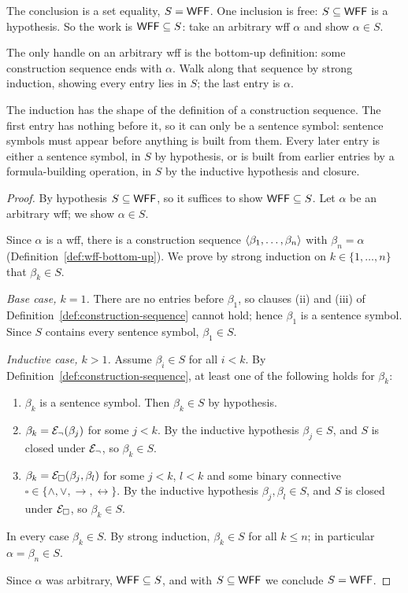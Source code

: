 \documentclass[11pt]{article}
\begin{document}
\begin{quantified}
\end{quantified}

\begin{remark}
The conclusion is a set equality, $S=\mathsf{WFF}$. One inclusion is free:
$S\subseteq\mathsf{WFF}$ is a hypothesis. So the work is $\mathsf{WFF}\subseteq S$: take an
arbitrary wff $\alpha$ and show $\alpha\in S$.

The only handle on an arbitrary wff is the bottom-up definition: some
construction sequence ends with $\alpha$. Walk along that sequence by strong
induction, showing every entry lies in $S$; the last entry is $\alpha$.

The induction has the shape of the definition of a construction sequence.
The first entry has nothing before it, so it can only be a sentence symbol:
sentence symbols must appear before anything is built from them. Every
later entry is either a sentence symbol, in $S$ by hypothesis, or is built
from earlier entries by a formula-building operation, in $S$ by the
inductive hypothesis and closure.
\end{remark}

\begin{proof}
By hypothesis $S\subseteq\mathsf{WFF}$, so it suffices to show $\mathsf{WFF}\subseteq S$.
Let $\alpha$ be an arbitrary wff; we show $\alpha\in S$.

Since $\alpha$ is a wff, there is a construction sequence
$\langle \beta_1,\dots,\beta_n\rangle$ with $\beta_n=\alpha$
(Definition~\ref{def:wff-bottom-up}). We prove by strong induction on
$k\in\{1,\dots,n\}$ that $\beta_k\in S$.

\emph{Base case, $k=1$.} There are no entries before $\beta_1$, so clauses
(ii) and (iii) of Definition~\ref{def:construction-sequence} cannot hold;
hence $\beta_1$ is a sentence symbol. Since $S$ contains every sentence
symbol, $\beta_1\in S$.

\emph{Inductive case, $k>1$.} Assume $\beta_i\in S$ for all $i<k$. By
Definition~\ref{def:construction-sequence}, at least one of the following
holds for $\beta_k$:
\begin{enumerate}[label=(\roman*)]
\item $\beta_k$ is a sentence symbol. Then $\beta_k\in S$ by hypothesis.
\item $\beta_k=\mathcal{E}_{\neg}(\beta_j)$ for some $j<k$. By the inductive
  hypothesis $\beta_j\in S$, and $S$ is closed under $\mathcal{E}_{\neg}$, so
  $\beta_k\in S$.
\item $\beta_k=\mathcal{E}_{\square}(\beta_j,\beta_l)$ for some $j<k$, $l<k$ and some
  binary connective $\square\in\{\land,\lor,\to,\leftrightarrow\}$. By the
  inductive hypothesis $\beta_j,\beta_l\in S$, and $S$ is closed under
  $\mathcal{E}_{\square}$, so $\beta_k\in S$.
\end{enumerate}
In every case $\beta_k\in S$. By strong induction, $\beta_k\in S$ for all
$k\le n$; in particular $\alpha=\beta_n\in S$.

Since $\alpha$ was arbitrary, $\mathsf{WFF}\subseteq S$, and with
$S\subseteq\mathsf{WFF}$ we conclude $S=\mathsf{WFF}$.
\end{proof}
\end{document}
